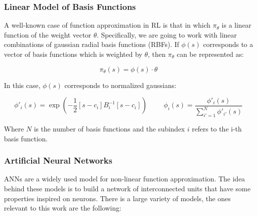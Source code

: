 \subsubsection{Linear Model of Basis Functions}
A well-known case of function approximation in RL is that in which $\pi_{\theta}$ is a linear function of
the weight vector $\theta$. Specifically, we are going to work with linear combinations of gaussian radial basis functions (RBFs). If $\phi(s)$ corresponds to a vector of basis functions which is weighted by $\theta$, then $\pi_{\theta}$ can be represented as:

\begin{equation}
    \pi_{\theta}(s) = \phi(s) \cdot \theta
    \label{eq:lcbf}
\end{equation}

In this case, $\phi(s)$ corresponds to normalized gaussians:

\begin{equation}
    \phi'_{i}(s) = \exp\left( -\frac{1}{2}[s - c_{i}]B^{-1}_{i}[s-c_{i}]\right) 
    \hspace{1cm}
    \phi_{i}(s) = \frac{\phi'_{i}(s)}{\sum_{i'=1}^{N}{\phi'_{i'}(s)}}
\end{equation}

Where $N$ is the number of basis functions and the subindex $i$ refers to the i-th basis function.

\subsubsection{Artificial Neural Networks}

ANNs are a widely used model for non-linear function approximation. The idea behind these models is to build a network of interconnected units that have some properties inspired on neurons. There is a large variety of models, the ones relevant to this work are the following:

